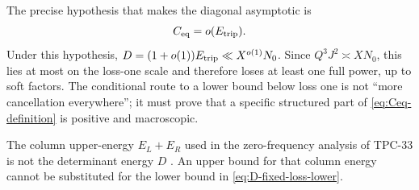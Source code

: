 \begin{remark}
\label{rem:decorrelation-trap}
The precise hypothesis that makes the diagonal asymptotic is
\[
 C_{\mathrm{eq}}=o(E_{\mathrm{trip}}).
\]
Under this hypothesis,
\(D=(1+o(1))E_{\mathrm{trip}}\ll X^{o(1)}N_0\).  Since
\(Q^3J^2\asymp XN_0\), this lies at most on the loss-one scale and
therefore loses at least one full power, up to soft factors.  The
conditional route to a lower bound below loss one is not ``more
cancellation everywhere''; it must prove that a specific structured
part of \eqref{eq:Ceq-definition} is positive and macroscopic.
\end{remark}

\begin{remark}
The column upper-energy \(E_L+E_R\) used in the zero-frequency
analysis of TPC-33 is not the determinant energy \(D\)
\citep{WangTPC33}.  An upper bound for that column energy cannot be
substituted for the lower bound in
\eqref{eq:D-fixed-loss-lower}.
\end{remark}
